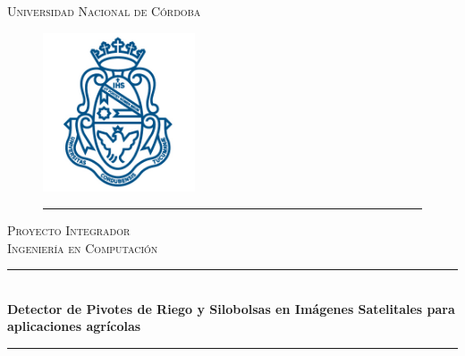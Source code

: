 \documentclass[runningheads]{llncs}
\begin{document}
\frontmatter %
\newcommand{\HRule}{\rule{\linewidth}{0.5mm}} %


\begin{titlepage}
\begin{center}
\textsc{\LARGE Universidad Nacional de Córdoba}\\ %

\begin{figure}[htbp]
	\centering
		\includegraphics[width=0.4\textwidth]{img/logo.png}
		\rule{35em}{0.5pt}
\end{figure}

\textsc{\Large Proyecto Integrador}\\[0.5cm] %
\textsc{\Large Ingeniería en Computación}\\[0.5cm] %

\HRule \\[0.4cm] %
{\LARGE \bfseries Detector de Pivotes de Riego y Silobolsas en Imágenes Satelitales para aplicaciones agrícolas
}\\[0.2cm] %
\HRule \\[0.5cm] %


\end{center}
\end{titlepage}
\end{document}
